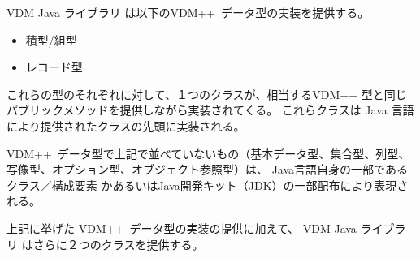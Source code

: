 \documentclass[\pformat,11pt]{jarticle}
\newcommand{\VDM}{VDM++}
\newcommand{\JL}{VDM Java ライブラリ}
\begin{document}
 \JL{} は以下の\VDM\ データ型の実装を提供する。

\begin{itemize} 
\item 積型/組型
\item レコード型
\end{itemize}

これらの型のそれぞれに対して、１つのクラスが、相当するVDM++ 型と同じパブリックメソッドを提供しながら実装されてくる。
これらクラスは Java 言語により提供されたクラスの先頭に実装される。

\VDM\ データ型で上記で並べていないもの（基本データ型、集合型、列型、写像型、オプション型、オブジェクト参照型）は、
Java言語自身の一部であるクラス／構成要素 かあるいはJava開発キット（JDK）の一部配布により表現される。

上記に挙げた \VDM\ データ型の実装の提供に加えて、 \JL{} はさらに２つのクラスを提供する。
\end{document}
